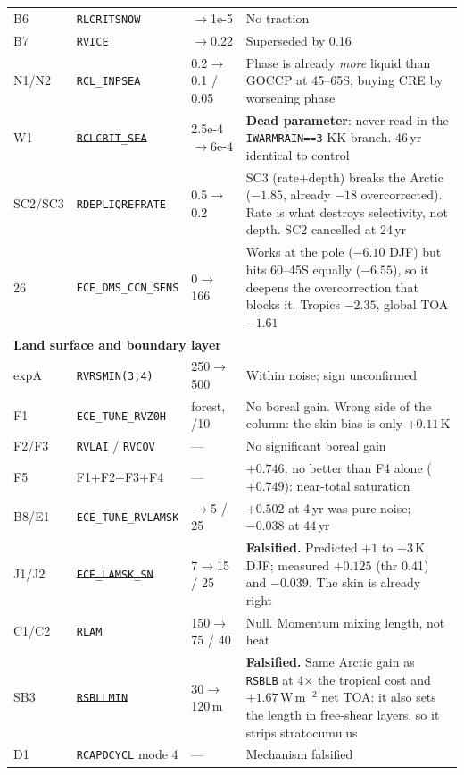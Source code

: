 \documentclass[9pt,a4paper]{article}
\begin{document}
\begin{center}
\begin{longtable}{p{} p{} p{} p{}}
B6 & \texttt{RLCRITSNOW} & $\to$1e-5 & No traction \\
B7 & \texttt{RVICE} & $\to$0.22 & Superseded by 0.16 \\
N1/N2 & \texttt{RCL\_INPSEA} & 0.2$\to$0.1 / 0.05 & Phase is already \emph{more} liquid than GOCCP at 45--65S; buying CRE by worsening phase \\
W1 & \sout{\texttt{RCLCRIT\_SEA}} & 2.5e-4$\to$6e-4 & \textbf{Dead parameter}: never read in the \texttt{IWARMRAIN==3} KK branch. 46\,yr identical to control \\
SC2/SC3 & \texttt{RDEPLIQREFRATE} & 0.5$\to$0.2 & SC3 (rate$+$depth) breaks the Arctic ($-1.85$, already $-18$ overcorrected). Rate is what destroys selectivity, not depth. SC2 cancelled at 24\,yr \\
26 & \texttt{ECE\_DMS\_CCN\_SENS} & 0$\to$166 & Works at the pole ($-6.10$ DJF) but hits 60--45S equally ($-6.55$), so it deepens the overcorrection that blocks it. Tropics $-2.35$, global TOA $-1.61$ \\
\midrule
\multicolumn{4}{l}{\textbf{Land surface and boundary layer}}\\
expA & \texttt{RVRSMIN(3,4)} & 250$\to$500 & Within noise; sign unconfirmed \\
F1 & \texttt{ECE\_TUNE\_RVZ0H} & forest, /10 & No boreal gain. Wrong side of the column: the skin bias is only $+0.11$\,K \\
F2/F3 & \texttt{RVLAI} / \texttt{RVCOV} & --- & No significant boreal gain \\
F5 & F1$+$F2$+$F3$+$F4 & --- & $+0.746$, no better than F4 alone ($+0.749$): near-total saturation \\
B8/E1 & \texttt{ECE\_TUNE\_RVLAMSK} & $\to$5 / 25 & $+0.502$ at 4\,yr was pure noise; $-0.038$ at 44\,yr \\
J1/J2 & \sout{\texttt{ECE\_LAMSK\_SN}} & 7$\to$15 / 25 & \textbf{Falsified.} Predicted $+1$ to $+3$\,K DJF; measured $+0.125$ (thr 0.41) and $-0.039$. The skin is already right \\
C1/C2 & \texttt{RLAM} & 150$\to$75 / 40 & Null. Momentum mixing length, not heat \\
SB3 & \sout{\texttt{RSBLLMIN}} & 30$\to$120\,m & \textbf{Falsified.} Same Arctic gain as \texttt{RSBLB} at 4$\times$ the tropical cost and $+1.67$\,W\,m$^{-2}$ net TOA: it also sets the length in free-shear layers, so it strips stratocumulus \\
D1 & \texttt{RCAPDCYCL} mode 4 & --- & Mechanism falsified \\
\midrule

\end{longtable}
\end{center}
\end{document}
